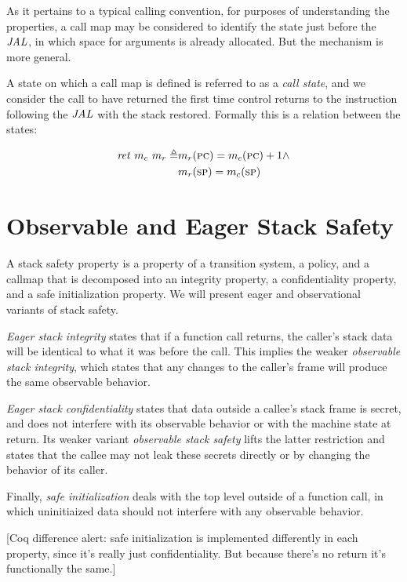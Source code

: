 \documentclass[conference]{IEEEtran}
\begin{document}
    As it pertains to a typical calling convention, for purposes of understanding the properties,
    a call map may be considered to identify the state just before the \(\mathit{JAL}\), in which space for
    arguments is already allocated. But the mechanism is more general.

    A state on which a call map is defined is referred to as a {\it call state}, and we consider
    the call to have returned the first time control returns to the instruction following the
    \(\mathit{JAL}\) with the stack restored. Formally this is a relation between the states:
    
    \[\begin{split}
      \mathit{ret}\ m_c\ m_r \triangleq & m_r(\textsc{pc}) = m_c(\textsc{pc})+1 \land \\
                                        & m_r(\textsc{sp}) = m_c(\textsc{sp})
    \end{split}\]

  \section{Observable and Eager Stack Safety}

    A stack safety property is a property of a transition system, a policy, and a callmap
    that is decomposed into an integrity property, a confidentiality property, and a safe
    initialization property. We will present eager and observational variants of stack safety.

    {\it Eager stack integrity} states that if a function call returns, the caller's stack data
    will be identical to what it was before the call. This implies the weaker {\it observable
    stack integrity}, which states that any changes to the caller's frame will produce the same
    observable behavior.

    {\it Eager stack confidentiality} states that data outside a callee's stack frame is secret,
    and does not interfere with its observable behavior or with the machine state at return. Its
    weaker variant {\it observable stack safety} lifts the latter restriction and states that
    the callee may not leak these secrets directly or by changing the behavior of its caller.

    Finally, {\it safe initialization} deals with the top level outside of a function call, in
    which uninitiaized data should not interfere with any observable behavior.

    [Coq difference alert: safe initialization is implemented differently in each property, since
     it's really just confidentiality. But because there's no return it's functionally the same.]
\end{document}
